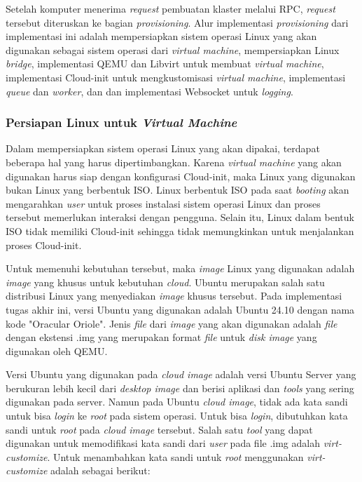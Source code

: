 Setelah komputer menerima \emph{request} pembuatan klaster melalui RPC,
\emph{request} tersebut diteruskan ke bagian \emph{provisioning}. Alur 
implementasi \emph{provisioning} dari implementasi ini adalah mempersiapkan
sistem operasi Linux yang akan digunakan sebagai sistem operasi dari
\emph{virtual machine}, mempersiapkan Linux \emph{bridge},
implementasi QEMU dan Libvirt untuk membuat \emph{virtual machine},
implementasi Cloud-init untuk mengkustomisasi \emph{virtual machine}, 
implementasi \emph{queue} dan \emph{worker}, dan
dan implementasi Websocket untuk \emph{logging}.

\subsubsection{Persiapan Linux untuk \emph{Virtual Machine}}
\label{sec:persiapan-linux-untuk-virtual-machine}

Dalam mempersiapkan sistem operasi Linux yang akan dipakai, terdapat beberapa
hal yang harus dipertimbangkan. Karena \emph{virtual machine} yang akan digunakan
harus siap dengan konfigurasi Cloud-init, maka Linux yang digunakan bukan Linux
yang berbentuk ISO. Linux berbentuk ISO pada saat \emph{booting} akan mengarahkan
\emph{user} untuk proses instalasi sistem operasi Linux dan proses tersebut memerlukan
interaksi dengan pengguna. Selain itu, Linux dalam bentuk ISO tidak memiliki Cloud-init
sehingga tidak memungkinkan untuk menjalankan proses Cloud-init.

Untuk memenuhi kebutuhan tersebut, maka \emph{image} Linux yang digunakan
adalah \emph{image} yang khusus untuk kebutuhan \emph{cloud}. Ubuntu merupakan
salah satu distribusi Linux yang menyediakan \emph{image} khusus tersebut.
Pada implementasi tugas akhir ini, versi Ubuntu yang digunakan adalah Ubuntu 24.10
dengan nama kode "Oracular Oriole". Jenis \emph{file} dari \emph{image} yang akan digunakan
adalah \emph{file} dengan ekstensi .img yang merupakan format \emph{file} untuk \emph{disk image}
yang digunakan oleh QEMU.

Versi Ubuntu yang digunakan pada \emph{cloud image} adalah versi Ubuntu Server yang
berukuran lebih kecil dari \emph{desktop image} dan berisi aplikasi dan \emph{tools}
yang sering digunakan pada server. Namun pada Ubuntu \emph{cloud image}, tidak ada
kata sandi untuk bisa \emph{login} ke \emph{root} pada sistem operasi. Untuk bisa \emph{login},
dibutuhkan kata sandi untuk \emph{root} pada \emph{cloud image} tersebut. Salah satu \emph{tool} yang
dapat digunakan untuk memodifikasi kata sandi dari \emph{user} pada file .img adalah \emph{virt-customize}.
Untuk menambahkan kata sandi untuk \emph{root} menggunakan \emph{virt-customize} adalah
sebagai berikut:

